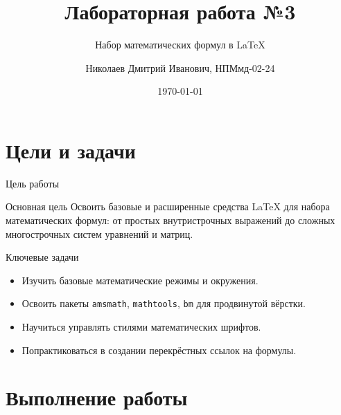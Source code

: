\documentclass[aspectratio=169]{beamer}
\title{Лабораторная работа №3}
\subtitle{Набор математических формул в LaTeX}
\author{Николаев Дмитрий Иванович, НПМмд-02-24}
\institute{Российский университет дружбы народов имени Патриса Лумумбы}
\date{\today}
\begin{document}
\frame{\titlepage}

\section{Цели и задачи}
\begin{frame}{Цель работы}
    \begin{block}{Основная цель}
        Освоить базовые и расширенные средства LaTeX для набора математических формул: от простых внутристрочных выражений до сложных многострочных систем уравнений и матриц.
    \end{block}
    \begin{alertblock}{Ключевые задачи}
    \begin{itemize}
        \item Изучить базовые математические режимы и окружения.
        \item Освоить пакеты \texttt{amsmath}, \texttt{mathtools}, \texttt{bm} для продвинутой вёрстки.
        \item Научиться управлять стилями математических шрифтов.
        \item Попрактиковаться в создании перекрёстных ссылок на формулы.
    \end{itemize}
    \end{alertblock}
\end{frame}

\section{Выполнение работы}
\end{document}
